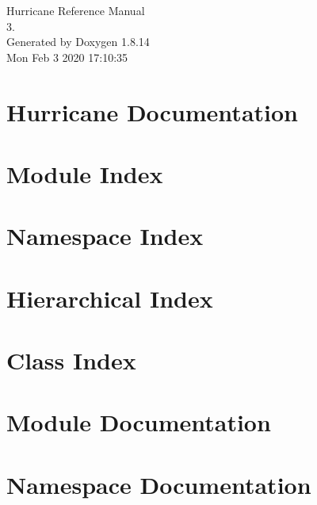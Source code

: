 \documentclass[a4paper]{asimbook}
\begin{document}
   \begin{titlepage}
     \vspace*{7cm}
     \begin{center}
     {\Large Hurricane Reference Manual\\[1ex]\large 3. }\\
     \vspace*{1cm}
     {\large Generated by Doxygen 1.8.14}\\
     \vspace*{0.5cm}
     {\small Mon Feb 3 2020 17:10:35}\\
     \end{center}
   \end{titlepage}

   \clearemptydoublepage

   \tableofcontents
   \clearemptydoublepage

\chapter{Hurricane Documentation}
\label{index}\hypertarget{index}{}
\chapter{Module Index}

\chapter{Namespace Index}

\chapter{Hierarchical Index}

\chapter{Class Index}

\chapter{Module Documentation}




\chapter{Namespace Documentation}

\end{document}
